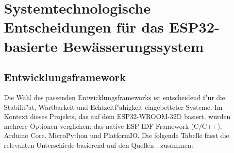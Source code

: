 \section{Systemtechnologische Entscheidungen für das ESP32-basierte Bewässerungssystem}

\subsection{Entwicklungsframework}

Die Wahl des passenden Entwicklungsframeworks ist entscheidend f"ur die Stabilit"at, Wartbarkeit und Echtzeitf"ahigkeit eingebetteter Systeme. Im Kontext dieses Projekts, das auf dem ESP32-WROOM-32D basiert, wurden mehrere Optionen verglichen: das native ESP-IDF-Framework (C/C++), Arduino Core, MicroPython und PlatformIO. Die folgende Tabelle fasst die relevanten Unterschiede basierend auf den Quellen \autocite{espressif_idf,arduino_esp32,micropython_docs,platformio}. zusammen:
\\
\begin{table}[H]
	\centering
	\caption{Vergleich von Entwicklungsframeworks für den ESP32}
	\label{tab:framework-vergleich}
\end{table}
\vspace{1em}

